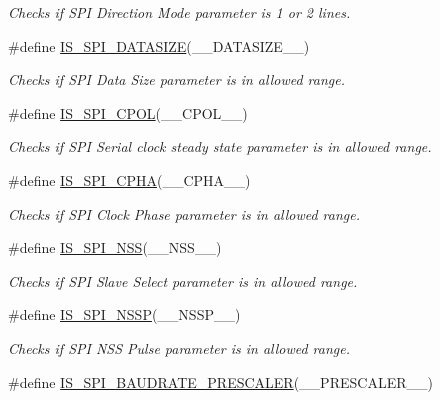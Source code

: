 \begin{DoxyCompactItemize}
\begin{DoxyCompactList}\small\item\em Checks if S\+PI Direction Mode parameter is 1 or 2 lines. \end{DoxyCompactList}\item 
\#define \mbox{\hyperlink{group___s_p_i___private___macros_gac04b1218a162772dca3854aa3a441856}{I\+S\+\_\+\+S\+P\+I\+\_\+\+D\+A\+T\+A\+S\+I\+ZE}}(\+\_\+\+\_\+\+D\+A\+T\+A\+S\+I\+Z\+E\+\_\+\+\_\+)
\begin{DoxyCompactList}\small\item\em Checks if S\+PI Data Size parameter is in allowed range. \end{DoxyCompactList}\item 
\#define \mbox{\hyperlink{group___s_p_i___private___macros_gad60cb1a9c1e1f89e8e9740a0ca734443}{I\+S\+\_\+\+S\+P\+I\+\_\+\+C\+P\+OL}}(\+\_\+\+\_\+\+C\+P\+O\+L\+\_\+\+\_\+)
\begin{DoxyCompactList}\small\item\em Checks if S\+PI Serial clock steady state parameter is in allowed range. \end{DoxyCompactList}\item 
\#define \mbox{\hyperlink{group___s_p_i___private___macros_gaf5ed92fbe83dada8ebcce64c04ef0f72}{I\+S\+\_\+\+S\+P\+I\+\_\+\+C\+P\+HA}}(\+\_\+\+\_\+\+C\+P\+H\+A\+\_\+\+\_\+)
\begin{DoxyCompactList}\small\item\em Checks if S\+PI Clock Phase parameter is in allowed range. \end{DoxyCompactList}\item 
\#define \mbox{\hyperlink{group___s_p_i___private___macros_ga7e90530e595a47ab465e3e222014f5e3}{I\+S\+\_\+\+S\+P\+I\+\_\+\+N\+SS}}(\+\_\+\+\_\+\+N\+S\+S\+\_\+\+\_\+)
\begin{DoxyCompactList}\small\item\em Checks if S\+PI Slave Select parameter is in allowed range. \end{DoxyCompactList}\item 
\#define \mbox{\hyperlink{group___s_p_i___private___macros_ga59317f70e75953c1c2f7d1d67d173db1}{I\+S\+\_\+\+S\+P\+I\+\_\+\+N\+S\+SP}}(\+\_\+\+\_\+\+N\+S\+S\+P\+\_\+\+\_\+)
\begin{DoxyCompactList}\small\item\em Checks if S\+PI N\+SS Pulse parameter is in allowed range. \end{DoxyCompactList}\item 
\#define \mbox{\hyperlink{group___s_p_i___private___macros_gad15d5bdc7ac1698d1956a25b200e1f25}{I\+S\+\_\+\+S\+P\+I\+\_\+\+B\+A\+U\+D\+R\+A\+T\+E\+\_\+\+P\+R\+E\+S\+C\+A\+L\+ER}}(\+\_\+\+\_\+\+P\+R\+E\+S\+C\+A\+L\+E\+R\+\_\+\+\_\+)

\end{DoxyCompactItemize}
